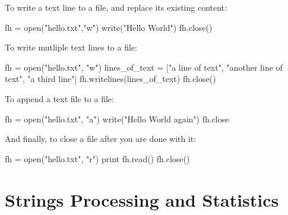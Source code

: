 \documentclass[
  letterpaper,
]{scrbook}
\newenvironment{Shaded}{\begin{snugshade}}{\end{snugshade}}
\newcommand{\BuiltInTok}[1]{\textcolor[rgb]{0.00,0.23,0.31}{#1}}
\newcommand{\NormalTok}[1]{\textcolor[rgb]{0.00,0.23,0.31}{#1}}
\newcommand{\OperatorTok}[1]{\textcolor[rgb]{0.37,0.37,0.37}{#1}}
\newcommand{\StringTok}[1]{\textcolor[rgb]{0.13,0.47,0.30}{#1}}
\begin{document}
To write a text line to a file, and replace its existing content:

\begin{Shaded}
\begin{Highlighting}[]
\NormalTok{fh }\OperatorTok{=} \BuiltInTok{open}\NormalTok{(}\StringTok{"hello.txt"}\NormalTok{,}\StringTok{"w"}\NormalTok{)}
\NormalTok{write(}\StringTok{"Hello World"}\NormalTok{)}
\NormalTok{fh.close()}
\end{Highlighting}
\end{Shaded}

To write mutliple text lines to a file:

\begin{Shaded}
\begin{Highlighting}[]
\NormalTok{fh }\OperatorTok{=} \BuiltInTok{open}\NormalTok{(}\StringTok{"hello.txt"}\NormalTok{, }\StringTok{"w"}\NormalTok{)}
\NormalTok{lines\_of\_text }\OperatorTok{=}\NormalTok{ [}\StringTok{"a line of text"}\NormalTok{, }\StringTok{"another line of text"}\NormalTok{, }\StringTok{"a third line"}\NormalTok{]}
\NormalTok{fh.writelines(lines\_of\_text)}
\NormalTok{fh.close()}
\end{Highlighting}
\end{Shaded}

To append a text file to a file:

\begin{Shaded}
\begin{Highlighting}[]
\NormalTok{fh }\OperatorTok{=} \BuiltInTok{open}\NormalTok{(}\StringTok{"hello.txt"}\NormalTok{, }\StringTok{"a"}\NormalTok{)}
\NormalTok{write(}\StringTok{"Hello World again"}\NormalTok{)}
\NormalTok{fh.close}
\end{Highlighting}
\end{Shaded}

And finally, to close a file after you are done with it:

\begin{Shaded}
\begin{Highlighting}[]
\NormalTok{fh }\OperatorTok{=} \BuiltInTok{open}\NormalTok{(}\StringTok{"hello.txt"}\NormalTok{, }\StringTok{"r"}\NormalTok{)}
\BuiltInTok{print}\NormalTok{ fh.read()}
\NormalTok{fh.close()}
\end{Highlighting}
\end{Shaded}

\section*{Strings Processing and
Statistics}\label{strings-processing-and-statistics}
\end{document}
